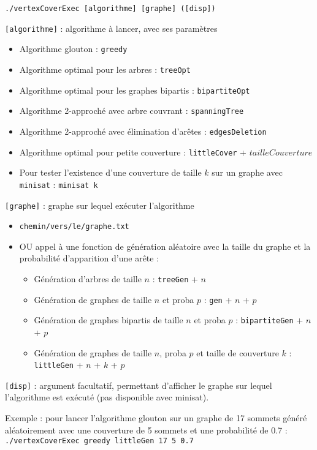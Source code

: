 \documentclass[a4paper,10pt]{article}
\newcommand*{\itemb}{\item[$\bullet$]}
\begin{document}
	\bigskip
	\texttt{./vertexCoverExec [algorithme] [graphe] ([disp])}

	\bigskip
	\texttt{[algorithme]} : algorithme à lancer, avec ses paramètres
	\begin{itemize}
		\item Algorithme glouton : \texttt{greedy}
		\item Algorithme optimal pour les arbres : \texttt{treeOpt}
		\item Algorithme optimal pour les graphes bipartis : \texttt{bipartiteOpt}
		\item Algorithme 2-approché avec arbre couvrant : \texttt{spanningTree}
		\item Algorithme 2-approché avec élimination d'arêtes : \texttt{edgesDeletion}
		\item Algorithme optimal pour petite couverture : \texttt{littleCover} + $tailleCouverture$
		\item Pour tester l'existence d'une couverture de taille $k$ sur un graphe avec \texttt{minisat} : \texttt{minisat k}
	\end{itemize}
	
	\bigskip
	\texttt{[graphe]} : graphe sur lequel exécuter l'algorithme
	\begin{itemize}
		\item \texttt{chemin/vers/le/graphe.txt}
		\item OU appel à une fonction de génération aléatoire avec la taille du graphe et la probabilité d'apparition d'une arête :
			\begin{itemize}
			\itemb Génération d'arbres de taille $n$ : \texttt{treeGen} + $n$
			\itemb Génération de graphes de taille $n$ et proba $p$ : \texttt{gen} + $n$ + $p$
			\itemb Génération de graphes bipartis de taille $n$ et proba $p$ : \texttt{bipartiteGen} + $n$ + $p$
			\itemb Génération de graphes de taille $n$, proba $p$ et taille de couverture $k$ : \texttt{littleGen} + $n$ + $k$ + $p$
			
			\end{itemize}
	\end{itemize}
	
	\bigskip
	\texttt{[disp]} : argument facultatif, permettant d'afficher le graphe sur lequel l'algorithme est exécuté (pas disponible avec minisat).
	
	\bigskip
	Exemple : pour lancer l'algorithme glouton sur un graphe de 17 sommets généré aléatoirement avec une couverture de 5 sommets et une probabilité de 0.7 :
	\texttt{./vertexCoverExec greedy littleGen 17 5 0.7}
	
\end{document}
